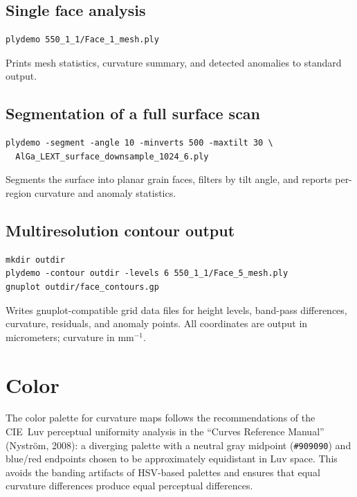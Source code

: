 \documentclass[11pt]{article}
\begin{document}
\subsection{Single face analysis}

\begin{lstlisting}
plydemo 550_1_1/Face_1_mesh.ply
\end{lstlisting}

Prints mesh statistics, curvature summary, and detected anomalies
to standard output.

\subsection{Segmentation of a full surface scan}

\begin{lstlisting}
plydemo -segment -angle 10 -minverts 500 -maxtilt 30 \
  AlGa_LEXT_surface_downsample_1024_6.ply
\end{lstlisting}

Segments the surface into planar grain faces, filters by tilt
angle, and reports per-region curvature and anomaly statistics.

\subsection{Multiresolution contour output}

\begin{lstlisting}
mkdir outdir
plydemo -contour outdir -levels 6 550_1_1/Face_5_mesh.ply
gnuplot outdir/face_contours.gp
\end{lstlisting}

Writes gnuplot-compatible grid data files for height levels,
band-pass differences, curvature, residuals, and anomaly points.
All coordinates are output in micrometers; curvature in
mm$^{-1}$.

\section{Color}

The color palette for curvature maps follows the recommendations
of the CIE~Luv perceptual uniformity analysis in the ``Curves
Reference Manual'' (Nystr\"om, 2008): a diverging palette with a
neutral gray midpoint (\texttt{\#909090}) and blue/red endpoints
chosen to be approximately equidistant in Luv space.  This avoids
the banding artifacts of HSV-based palettes and ensures that equal
curvature differences produce equal perceptual differences.
\end{document}
